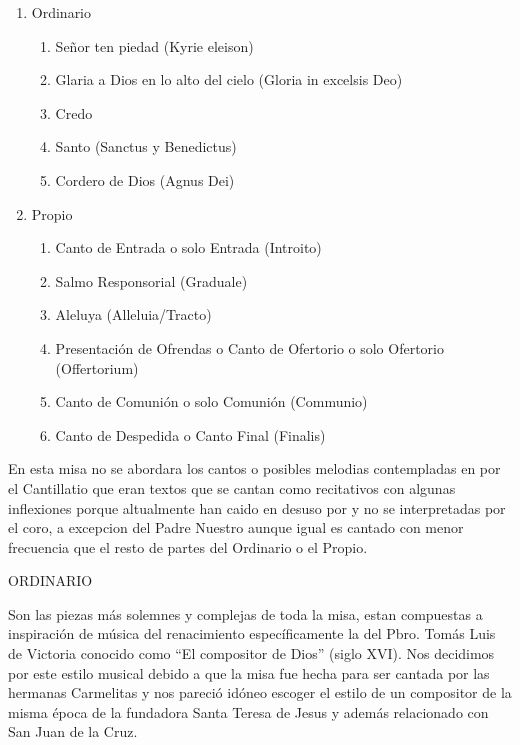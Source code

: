 \documentclass[12pt, letterpaper]{report}
\begin{document}
    \renewcommand{\theenumi}{\arabic{enumi}}
    \begin{enumerate}
        \item Ordinario
        \begin{enumerate}
            \item Se\~nor ten piedad (Kyrie eleison)
            \item Glaria a Dios en lo alto del cielo (Gloria in excelsis Deo)
            \item Credo
            \item Santo (Sanctus y Benedictus)
            \item Cordero de Dios (Agnus Dei)
        \end{enumerate}

        \item Propio
        \begin{enumerate}
            \item Canto de Entrada o solo Entrada (Introito)
            \item Salmo Responsorial (Graduale)
            \item Aleluya (Alleluia/Tracto)
            \item Presentaci\'on de Ofrendas o Canto de Ofertorio o solo Ofertorio (Offertorium)
            \item Canto de Comuni\'on o solo Comuni\'on (Communio)
            \item Canto de Despedida o Canto Final (Finalis)
        \end{enumerate}
    \end{enumerate}

    En esta misa no se abordara los cantos o posibles melodias contempladas en por el Cantillatio que eran textos que se cantan como recitativos con algunas inflexiones porque altualmente han caido en desuso por y no se interpretadas por el coro, a excepcion del Padre Nuestro aunque igual es cantado con menor frecuencia que el resto de partes del Ordinario o el Propio.

    \LARGE ORDINARIO

    \Large Son las piezas m\'as solemnes y complejas de toda la misa, estan compuestas a inspiraci\'on de m\'usica del renacimiento espec\'ificamente la del Pbro. Tom\'as Luis de Victoria conocido como ``El compositor de Dios'' (siglo XVI). Nos decidimos por este estilo musical debido a que la misa fue hecha para ser cantada por las hermanas Carmelitas y nos pareci\'o id\'oneo escoger el estilo de un compositor de la misma \'epoca de la fundadora Santa Teresa de Jesus y adem\'as relacionado con San Juan de la Cruz.
\end{document}
